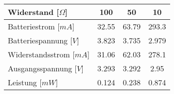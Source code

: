 \begin{table}[hp]
\centering
\label{messungen_Energie}
\begin{tabular}{|l|c|c|c|}
\hline
Widerstand [$\Omega$]     & 100   & 50    & 10    \\ \hline
Batteriestrom [$mA$]    & 32.55 & 63.79 & 293.3 \\ \hline
Batteriespannung [$V$] & 3.823 & 3.735 & 2.979 \\ \hline
Widerstandsstrom [$mA$] & 31.06 & 62.03 & 278.1 \\ \hline
Ausgangsspannung [$V$]  & 3.293 & 3.292 & 2.95  \\ \hline
Leistung [$mW$]  & 0.124 & 0.238 & 0.874  \\ \hline
\end{tabular}
\end{table}

